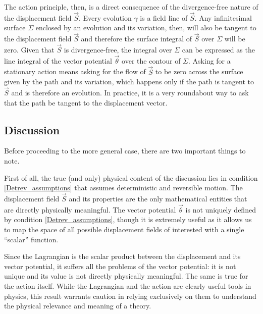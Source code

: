\documentclass[10pt,twocolumn, nofootinbib]{revtex4-2}
\begin{document}
The action principle, then, is a direct consequence of the divergence-free nature of the displacement field $\vec{S}$. Every evolution $\gamma$ is a field line of $\vec{S}$. Any infinitesimal surface $\Sigma$ enclosed by an evolution and its variation, then, will also be tangent to the displacement field $\vec{S}$ and therefore the surface integral of $\vec{S}$ over $\Sigma$ will be zero. Given that $\vec{S}$ is divergence-free, the integral over $\Sigma$ can be expressed as the line integral of the vector potential $\vec{\theta}$ over the contour of $\Sigma$. Asking for a stationary action means asking for the flow of $\vec{S}$ to be zero across the surface given by the path and its variation, which happens only if the path is tangent to $\vec{S}$ and is therefore an evolution. In practice, it is a very roundabout way to ask that the path be tangent to the displacement vector.

\subsection{Discussion}

Before proceeding to the more general case, there are two important things to note.

First of all, the true (and only) physical content of the discussion lies in condition \ref{Detrev_assumptions} that assumes deterministic and reversible motion. The displacement field $\vec{S}$ and its properties are the only mathematical entities that are directly physically meaningful. The vector potential $\vec{\theta}$ is not uniquely defined by condition \ref{Detrev_assumptions}, though it is extremely useful as it allows us to map the space of all possible displacement fields of interested with a single ``scalar'' function.

Since the Lagrangian is the scalar product between the displacement and its vector potential, it suffers all the problems of the vector potential: it is not unique and its value is not directly physically meaningful. The same is true for the action itself. While the Lagrangian and the action are clearly useful tools in physics, this result warrants caution in relying exclusively on them to understand the physical relevance and meaning of a theory.
\end{document}
